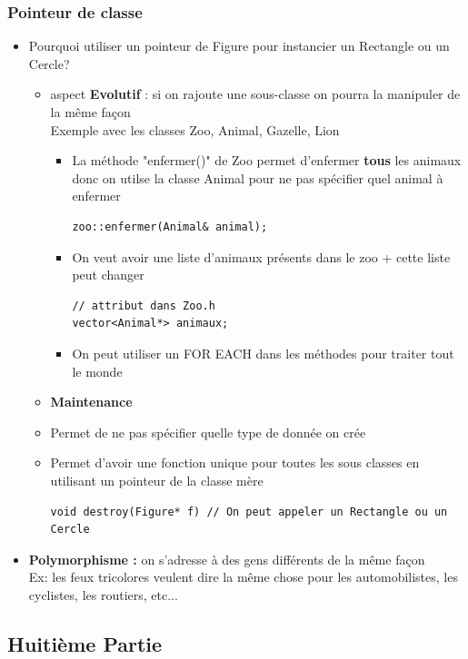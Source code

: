 \documentclass[12pt,a4paper]{article}
\begin{document}
\subsubsection{Pointeur de classe}
\begin{itemize}
\item Pourquoi utiliser un pointeur de Figure pour instancier un Rectangle ou un Cercle?
\begin{itemize}
\item aspect \textbf{Evolutif} : si on rajoute une sous-classe on pourra la manipuler de la même façon \\
Exemple avec les classes Zoo, Animal, Gazelle, Lion
\begin{itemize}
\item La méthode "enfermer()" de Zoo permet d'enfermer \textbf{tous} les animaux donc on utilse la classe Animal pour ne pas spécifier quel animal à enfermer
\begin{lstlisting}
zoo::enfermer(Animal& animal);
\end{lstlisting}
\item On veut avoir une liste d'animaux présents dans le zoo + cette liste peut changer
\begin{lstlisting}
// attribut dans Zoo.h
vector<Animal*> animaux;
\end{lstlisting}
\item On peut utiliser un FOR EACH dans les méthodes pour traiter tout le monde
\end{itemize}
\item \textbf{Maintenance}
\item Permet de ne pas spécifier quelle type de donnée on crée
\item Permet d'avoir une fonction unique pour toutes les sous classes en utilisant un pointeur de la classe mère
\begin{lstlisting}
void destroy(Figure* f) // On peut appeler un Rectangle ou un Cercle
\end{lstlisting}
\end{itemize}
\item \textbf{Polymorphisme :} on s'adresse à des gens différents de la même façon\\
Ex: les feux tricolores veulent dire la même chose pour les automobilistes, les cyclistes, les routiers, etc...
\end{itemize}

\subsection{Huitième Partie}
\end{document}
